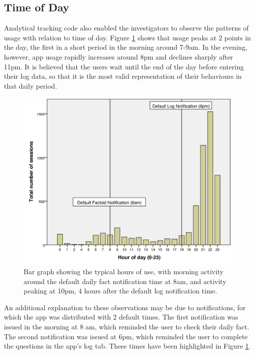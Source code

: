 \subsection{Time of Day} \label{subsection: time-of-day}
Analytical tracking code also enabled the investigators to observe the patterns of usage with relation to time of day. Figure \ref{fig: time-of-day} shows that usage peaks at 2 points in the day, the first in a short period in the morning around 7-9am. In the evening, however, app usage rapidly increases around 8pm and declines sharply after 11pm. It is believed that the users wait until the end of the day before entering their log data, so that it is the most valid representation of their behaviours in that daily period.

 \begin{figure}[h]
    \centering
    \includegraphics[scale=0.18, angle=0]{Files/prevention-study-3/figures/hour-of-day}
    \caption{Bar graph showing the typical hours of use, with morning activity around the default daily fact notification time at 8am, and activity peaking at 10pm, 4 hours after the default log notification time.}
    \label{fig: time-of-day}
\end{figure}

An additional explanation to these observations may be due to notifications, for which the app was distributed with 2 default times. The first notification was issued in the morning at 8 am, which reminded the user to check their daily fact. The second notification was issued at 6pm, which reminded the user to complete the questions in the app’s log tab. These times have been highlighted in Figure \ref{fig: time-of-day}.

